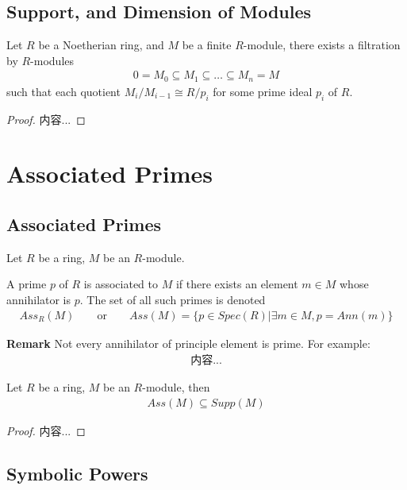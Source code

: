 \documentclass[Total.tex]{subfiles}
\begin{document}
		\section{Support, and Dimension of Modules}
			
			\begin{lemma}
				Let $R$ be a Noetherian ring, and $M$ be a finite $R$-module, there exists a filtration by $R$-modules
				\begin{gather*}
					0=M_0\subseteq M_1\subseteq \dots \subseteq M_n=M
				\end{gather*}
				such that each quotient $M_i/M_{i-1}\cong R/p_i$ for some prime ideal $p_i$ of $R$.
			\end{lemma}
			\begin{proof}
				内容...
			\end{proof}
	\chapter{Associated Primes}
		\section{Associated Primes}
			\begin{Def}
				Let $R$ be a ring, $M$ be an $R$-module.
				
				A prime $p$ of $R$ is associated to $M$ if there exists an element $m\in M$ whose annihilator is $p$. The set of all such primes is denoted
				\begin{gather*}
					Ass_R(M)\qquad\mbox{or}\qquad Ass(M)=\{p\in Spec(R)|\exists m\in M,p=Ann(m)\}
				\end{gather*}
			\end{Def}
			
			\textbf{Remark} Not every annihilator of principle element is prime. For example:
			\begin{gather*}
				内容...
			\end{gather*}
			
			\begin{lemma}
				Let $R$ be a ring, $M$ be an $R$-module, then
				\begin{gather*}
					Ass(M)\subseteq Supp(M)
				\end{gather*}
			\end{lemma}
			\begin{proof}
				内容...
			\end{proof}
		\section{Symbolic Powers}
\end{document}
